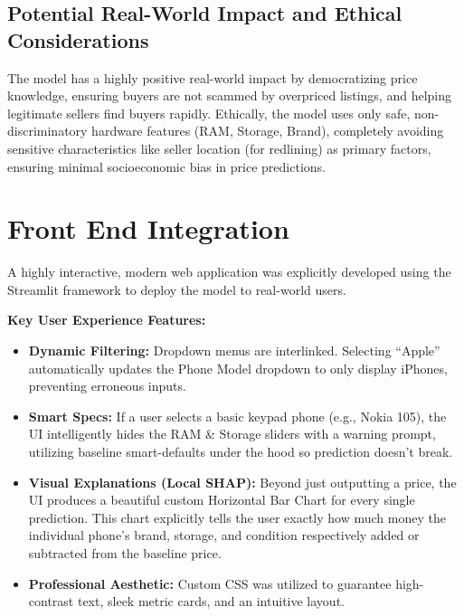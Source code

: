 \documentclass[12pt,a4paper]{article}
\begin{document}
\subsection{Potential Real-World Impact and Ethical Considerations}
The model has a highly positive real-world impact by democratizing price knowledge, ensuring buyers are not scammed by overpriced listings, and helping legitimate sellers find buyers rapidly. Ethically, the model uses only safe, non-discriminatory hardware features (RAM, Storage, Brand), completely avoiding sensitive characteristics like seller location (for redlining) as primary factors, ensuring minimal socioeconomic bias in price predictions. 

\section{Front End Integration}
A highly interactive, modern web application was explicitly developed using the Streamlit framework to deploy the model to real-world users. 

\textbf{Key User Experience Features:}
\begin{itemize}
    \item \textbf{Dynamic Filtering:} Dropdown menus are interlinked. Selecting ``Apple'' automatically updates the Phone Model dropdown to only display iPhones, preventing erroneous inputs. 
    \item \textbf{Smart Specs:} If a user selects a basic keypad phone (e.g., Nokia 105), the UI intelligently hides the RAM \& Storage sliders with a warning prompt, utilizing baseline smart-defaults under the hood so prediction doesn't break. 
    \item \textbf{Visual Explanations (Local SHAP):} Beyond just outputting a price, the UI produces a beautiful custom Horizontal Bar Chart for every single prediction. This chart explicitly tells the user exactly how much money the individual phone's brand, storage, and condition respectively added or subtracted from the baseline price. 
    \item \textbf{Professional Aesthetic:} Custom CSS was utilized to guarantee high-contrast text, sleek metric cards, and an intuitive layout.
\end{itemize}
\end{document}
